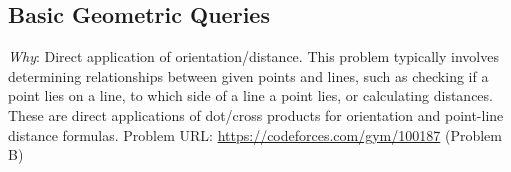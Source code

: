 \subsection{Basic Geometric Queries}
\label{ssec:A.4.1}
\begin{problemexample}
\label{probex:A.4.1}
\textit{Why}: Direct application of orientation/distance.
This problem typically involves determining relationships between given points and lines, such as checking if a point lies on a line, to which side of a line a point lies, or calculating distances. These are direct applications of dot/cross products for orientation and point-line distance formulas.
Problem URL: \url{https://codeforces.com/gym/100187} (Problem B)
\end{problemexample}
